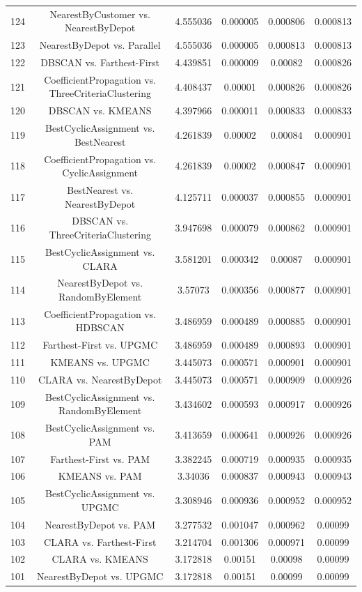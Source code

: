 \documentclass[a4paper,10pt]{article}
\begin{document}
\begin{landscape}
\begin{table}[!htp]
\begin{tabular}{cccccc}
124&NearestByCustomer vs. NearestByDepot&4.555036&0.000005&0.000806&0.000813\\
123&NearestByDepot vs. Parallel&4.555036&0.000005&0.000813&0.000813\\
122&DBSCAN vs. Farthest-First&4.439851&0.000009&0.00082&0.000826\\
121&CoefficientPropagation vs. ThreeCriteriaClustering&4.408437&0.00001&0.000826&0.000826\\
120&DBSCAN vs. KMEANS&4.397966&0.000011&0.000833&0.000833\\
119&BestCyclicAssignment vs. BestNearest&4.261839&0.00002&0.00084&0.000901\\
118&CoefficientPropagation vs. CyclicAssignment&4.261839&0.00002&0.000847&0.000901\\
117&BestNearest vs. NearestByDepot&4.125711&0.000037&0.000855&0.000901\\
116&DBSCAN vs. ThreeCriteriaClustering&3.947698&0.000079&0.000862&0.000901\\
115&BestCyclicAssignment vs. CLARA&3.581201&0.000342&0.00087&0.000901\\
114&NearestByDepot vs. RandomByElement&3.57073&0.000356&0.000877&0.000901\\
113&CoefficientPropagation vs. HDBSCAN&3.486959&0.000489&0.000885&0.000901\\
112&Farthest-First vs. UPGMC&3.486959&0.000489&0.000893&0.000901\\
111&KMEANS vs. UPGMC&3.445073&0.000571&0.000901&0.000901\\
110&CLARA vs. NearestByDepot&3.445073&0.000571&0.000909&0.000926\\
109&BestCyclicAssignment vs. RandomByElement&3.434602&0.000593&0.000917&0.000926\\
108&BestCyclicAssignment vs. PAM&3.413659&0.000641&0.000926&0.000926\\
107&Farthest-First vs. PAM&3.382245&0.000719&0.000935&0.000935\\
106&KMEANS vs. PAM&3.34036&0.000837&0.000943&0.000943\\
105&BestCyclicAssignment vs. UPGMC&3.308946&0.000936&0.000952&0.000952\\
104&NearestByDepot vs. PAM&3.277532&0.001047&0.000962&0.00099\\
103&CLARA vs. Farthest-First&3.214704&0.001306&0.000971&0.00099\\
102&CLARA vs. KMEANS&3.172818&0.00151&0.00098&0.00099\\
101&NearestByDepot vs. UPGMC&3.172818&0.00151&0.00099&0.00099\\

\end{tabular}
\end{table}
\end{landscape}
\end{document}
